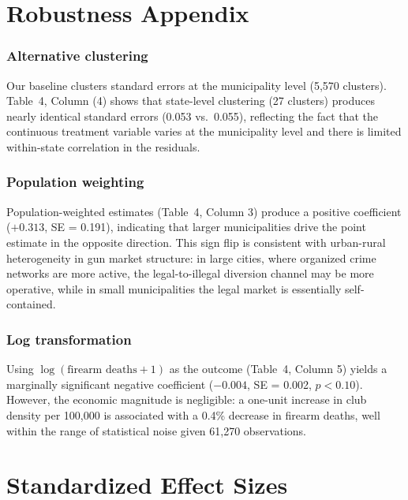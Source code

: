 \documentclass[12pt]{article}
\begin{document}
\section{Robustness Appendix}
\label{sec:appendix_robust}

\subsubsection*{Alternative clustering} Our baseline clusters standard errors at the municipality level (5,570 clusters). Table~4, Column (4) shows that state-level clustering (27 clusters) produces nearly identical standard errors (0.053 vs.\ 0.055), reflecting the fact that the continuous treatment variable varies at the municipality level and there is limited within-state correlation in the residuals.

\subsubsection*{Population weighting} Population-weighted estimates (Table~4, Column 3) produce a positive coefficient ($+0.313$, SE = 0.191), indicating that larger municipalities drive the point estimate in the opposite direction. This sign flip is consistent with urban-rural heterogeneity in gun market structure: in large cities, where organized crime networks are more active, the legal-to-illegal diversion channel may be more operative, while in small municipalities the legal market is essentially self-contained.

\subsubsection*{Log transformation} Using $\log(\text{firearm deaths} + 1)$ as the outcome (Table~4, Column 5) yields a marginally significant negative coefficient ($-0.004$, SE = 0.002, $p < 0.10$). However, the economic magnitude is negligible: a one-unit increase in club density per 100,000 is associated with a 0.4\% decrease in firearm deaths, well within the range of statistical noise given 61,270 observations.


\section{Standardized Effect Sizes}
\label{sec:sde}


\end{document}
